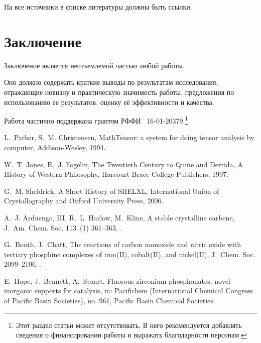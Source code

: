 \documentclass[60x84/16,8pt]{ittmm}
\begin{document}
На все источники в списке литературы должны быть ссылки.

\section{Заключение}

Заключение является неотъемлемой частью любой работы. 

Оно должно содержать краткие выводы по результатам исследования,
отражающие новизну и практическую значимость работы, предложения по
использованию ее результатов, оценку её эффективности и качества.


\begin{acknowledgments}
  Работа частично поддержана грантом РФФИ
  \textnumero~16-01-20379.\footnote{Этот раздел статьи может
    отсутствовать.  В него рекомендуется добавлять сведения о
    финансировании работы и выражать благодарности персонам.}
\end{acknowledgments}


\begin{thebibliography}{99}

L.~Parker, S.~M. Christensen, MathTensor: a system for doing tensor analysis by
  computer, Addison-Wesley, 1994.

W.~T. Jones, R.~J. Fogelin, The Twentieth Century to Quine and Derrida, A
  History of Western Philosophy, Harcourt Brace College Publishers, 1997.

G.~M. Sheldrick, A Short History of SHELXL, International Union of
  Crystallography and Oxford University Press, 2006.

A.~J. Arduengo, III, R.~L. Harlow, M.~Kline, A stable crystalline carbene,
  J.~Am. Chem. Soc. 113~(1)  361--363.
\newblock \href {http://dx.doi.org/10.1021/ja00001a054}
  {}.

G.~Booth, J.~Chatt, The reactions of carbon monoxide and nitric oxide with
  tertiary phosphine complexes of iron({II}), cobalt({II}), and nickel({II}),
  J.~Chem. Soc.  2099--2106. \href {http://dx.doi.org/10.1039/JR9620002099}
  {}.

E.~Hope, J.~Bennett, A.~Stuart, Fluorous zirconium phosphonates: novel
  inorganic supports for catalysis, in: Pacifichem (International Chemical
  Congress of Pacific Basin Societies), no. 961, Pacific Basin Chemical
  Societies.

\end{thebibliography}


% 
% 

\makealttitle      
\end{document}
